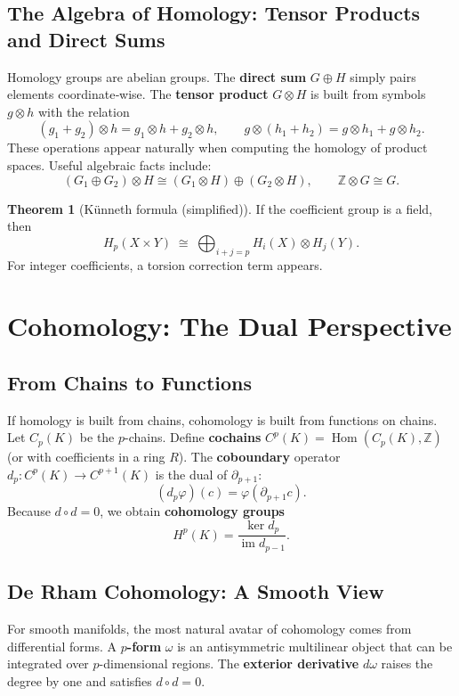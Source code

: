 \documentclass{article}
\theoremstyle{definition}
\newtheorem{theorem}{Theorem}[section]
\begin{document}
\subsection{The Algebra of Homology: Tensor Products and Direct Sums}
Homology groups are abelian groups. The \textbf{direct sum} $G\oplus H$ simply pairs elements coordinate‑wise.  
The \textbf{tensor product} $G \otimes H$ is built from symbols $g\otimes h$ with the relation
\[
(g_1+g_2)\otimes h = g_1\otimes h + g_2\otimes h,\qquad g\otimes (h_1+h_2) = g\otimes h_1 + g\otimes h_2.
\]
These operations appear naturally when computing the homology of product spaces. Useful algebraic facts include:
\[
(G_1\oplus G_2)\otimes H \cong (G_1\otimes H)\oplus (G_2\otimes H),\qquad \mathbb{Z}\otimes G \cong G.
\]

\begin{theorem}[Künneth formula (simplified)]
If the coefficient group is a field, then
\[
H_p(X\times Y) \;\cong\; \bigoplus_{i+j=p} H_i(X) \otimes H_j(Y).
\]
For integer coefficients, a torsion correction term appears.
\end{theorem}

\section{Cohomology: The Dual Perspective}

\subsection{From Chains to Functions}
If homology is built from chains, cohomology is built from functions on chains.
Let $C_p(K)$ be the $p$-chains. Define \textbf{cochains} $C^p(K) = \operatorname{Hom}(C_p(K), \mathbb{Z})$ (or with coefficients in a ring $R$).
The \textbf{coboundary} operator $d_p : C^p(K) \to C^{p+1}(K)$ is the dual of $\partial_{p+1}$:
\[
(d_p \varphi)(c) = \varphi(\partial_{p+1} c).
\]
Because $d\circ d = 0$, we obtain \textbf{cohomology groups}
\[
H^p(K) = \frac{\ker d_p}{\operatorname{im} d_{p-1}}.
\]

\subsection{De Rham Cohomology: A Smooth View}
For smooth manifolds, the most natural avatar of cohomology comes from differential forms.
A \textbf{$p$-form} $\omega$ is an antisymmetric multilinear object that can be integrated over $p$-dimensional regions.
The \textbf{exterior derivative} $d\omega$ raises the degree by one and satisfies $d\circ d = 0$.
\end{document}
